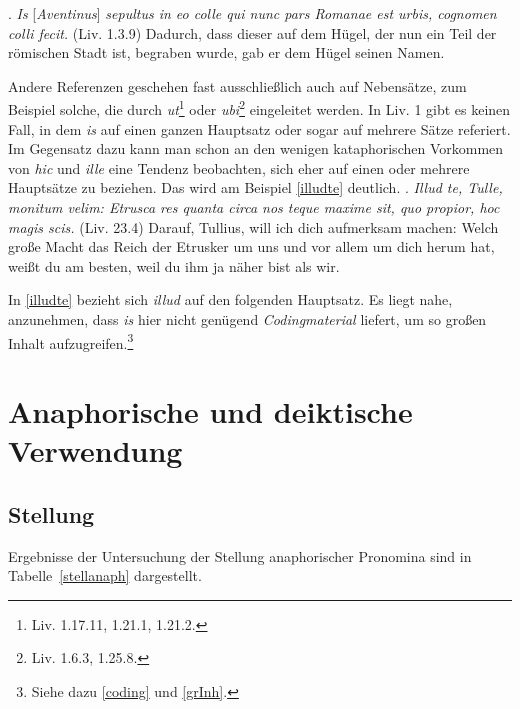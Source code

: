 \documentclass[12pt]{article}
\newcommand{\lat}[1]{\textit{#1}} %
\begin{document}
\ex.
\label{sepultus}
\lat{Is} [\lat{Aventinus}] \lat{sepultus in eo colle qui nunc pars Romanae est urbis, cognomen colli fecit.} (Liv. 1.3.9)
\trans Dadurch, dass dieser auf dem Hügel, der nun ein Teil der römischen Stadt ist, begraben wurde, gab er dem Hügel seinen Namen.

Andere Referenzen geschehen fast ausschließlich auch auf Nebensätze, zum Beispiel solche, die durch \lat{ut}\footnote{Liv. 1.17.11, 1.21.1, 1.21.2.} oder \lat{ubi}\footnote{Liv. 1.6.3, 1.25.8.} eingeleitet werden. In Liv. 1 gibt es keinen Fall, in dem \lat{is} auf einen ganzen Hauptsatz oder sogar auf mehrere Sätze referiert.
Im Gegensatz dazu kann man schon an den wenigen kataphorischen Vorkommen von \lat{hic} und \lat{ille} eine Tendenz beobachten, sich eher auf einen oder mehrere Hauptsätze zu beziehen. Das wird am Beispiel \ref{illudte} deutlich.
\ex.
\label{illudte}
\lat{Illud te, Tulle, monitum velim: Etrusca res quanta circa nos teque maxime sit, quo propior, hoc magis scis.} (Liv. 23.4)
\trans Darauf, Tullius, will ich dich aufmerksam machen: Welch große Macht das Reich der Etrusker um uns und vor allem um dich herum hat, weißt du am besten, weil du ihm ja näher bist als wir.

In \ref{illudte} bezieht sich \lat{illud} auf den folgenden Hauptsatz.
Es liegt nahe, anzunehmen, dass \lat{is} hier nicht genügend \emph{Codingmaterial} liefert, um so großen Inhalt aufzugreifen.\footnote{Siehe dazu \ref{coding} und \ref{grInh}.}




\section{Anaphorische und deiktische Verwendung}


\subsection{Stellung}

Ergebnisse der Untersuchung der Stellung anaphorischer Pronomina sind in Tabelle~\ref{stellanaph} dargestellt.
\end{document}
